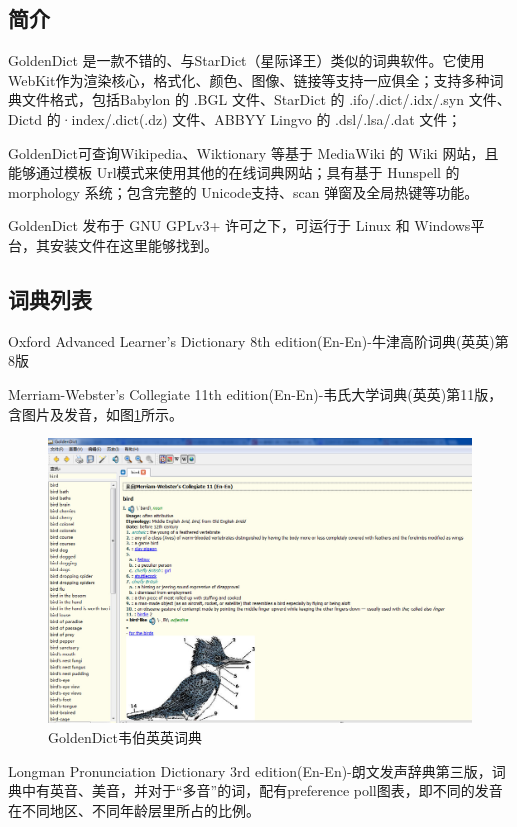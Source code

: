 \documentclass[paper=a4,fontsize=11pt]{article}
\begin{document}
	\subsection{简介}
	
	GoldenDict 是一款不错的、与StarDict（星际译王）类似的词典软件。它使用 WebKit作为渲染核心，格式化、颜色、图像、链接等支持一应俱全；支持多种词典文件格式，包括Babylon 的 .BGL 文件、StarDict 的 .ifo/.dict/.idx/.syn 文件、Dictd 的·index/.dict(.dz) 文件、ABBYY Lingvo 的 .dsl/.lsa/.dat 文件；
	
	GoldenDict可查询Wikipedia、Wiktionary 等基于 MediaWiki 的 Wiki 网站，且能够通过模板 Url模式来使用其他的在线词典网站；具有基于 Hunspell 的 morphology 系统；包含完整的 Unicode支持、scan 弹窗及全局热键等功能。
	
	GoldenDict 发布于 GNU GPLv3+ 许可之下，可运行于 Linux 和 Windows平台，其安装文件在这里能够找到。
	
	\subsection{词典列表}
	
	Oxford Advanced Learner's Dictionary 8th edition(En-En)-牛津高阶词典(英英)第8版
	
	Merriam-Webster's Collegiate 11th edition(En-En)-韦氏大学词典(英英)第11版，含图片及发音，如图\ref{GoldenDictWebster}所示。    
	
	\begin{figure}[htbp]
		\centering
		\includegraphics[scale=0.35]{GoldenDictWebster.jpg}
		\caption{GoldenDict韦伯英英词典}
		\label{GoldenDictWebster}
	\end{figure}
	
	Longman Pronunciation Dictionary 3rd edition(En-En)-朗文发声辞典第三版，词典中有英音、美音，并对于“多音”的词，配有preference poll图表，即不同的发音在不同地区、不同年龄层里所占的比例。  
	
\end{document}
